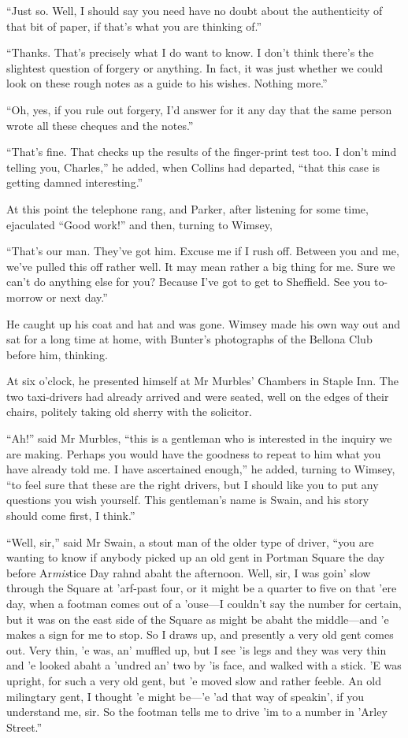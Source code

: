 \enquote{Just so. Well, I should say you need have no doubt about the authenticity of that bit of paper, if that's what you are thinking of.}

\enquote{Thanks. That's precisely what I do want to know. I don't think there's the slightest question of forgery or anything. In fact, it was just whether we could look on these rough notes as a guide to his wishes. Nothing more.}

\enquote{Oh, yes, if you rule out forgery, I'd answer for it any day that the same person wrote all these cheques and the notes.}

\enquote{That's fine. That checks up the results of the finger-print test too. I don't mind telling you, Charles,} he added, when Collins had departed, \enquote{that this case is getting damned interesting.}

At this point the telephone rang, and Parker, after listening for some time, ejaculated \enquote{Good work!} and then, turning to Wimsey,

\enquote{That's our man. They've got him. Excuse me if I rush off. Between you and me, we've pulled this off rather well. It may mean rather a big thing for me. Sure we can't do anything else for you? Because I've got to get to Sheffield. See you to-morrow or next day.}

He caught up his coat and hat and was gone. Wimsey made his own way out and sat for a long time at home, with Bunter's photographs of the Bellona Club before him, thinking.

At six o'clock, he presented himself at Mr Murbles' Chambers in Staple Inn. The two taxi-drivers had already arrived and were seated, well on the edges of their chairs, politely taking old sherry with the solicitor.

\enquote{Ah!} said Mr Murbles, \enquote{this is a gentleman who is interested in the inquiry we are making. Perhaps you would have the goodness to repeat to him what you have already told me. I have ascertained enough,} he added, turning to Wimsey, \enquote{to feel sure that these are the right drivers, but I should like you to put any questions you wish yourself. This gentleman's name is Swain, and his story should come first, I think.}

\enquote{Well, sir,} said Mr Swain, a stout man of the older type of driver, \enquote{you are wanting to know if anybody picked up an old gent in Portman Square the day before Ar\textit{mis}tice Day rahnd abaht the afternoon. Well, sir, I was goin' slow through the Square at 'arf-past four, or it might be a quarter to five on that 'ere day, when a footman comes out of a 'ouse\allowbreak---\allowbreak I couldn't say the number for certain, but it was on the east side of the Square as might be abaht the middle\allowbreak---\allowbreak and 'e makes a sign for me to stop. So I draws up, and presently a very old gent comes out. Very thin, 'e was, an' muffled up, but I see 'is legs and they was very thin and 'e looked abaht a 'undred an' two by 'is face, and walked with a stick. 'E was upright, for such a very old gent, but 'e moved slow and rather feeble. An old milingtary gent, I thought 'e might be---'e 'ad that way of speakin', if you understand me, sir. So the footman tells me to drive 'im to a number in 'Arley Street.}


